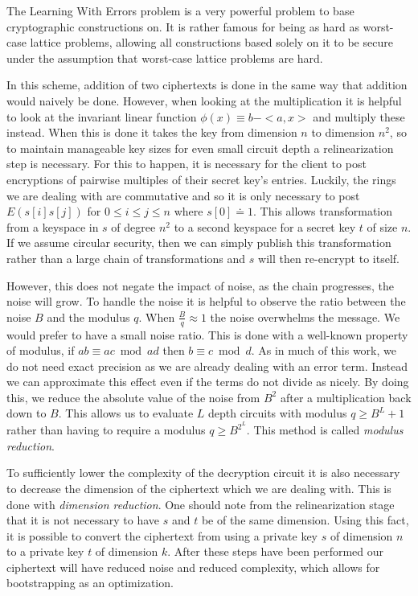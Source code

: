 \documentclass[letterpaper,twocolumn,10pt]{article}
\begin{document}
The Learning With Errors problem is a very powerful problem to base cryptographic constructions on. It is rather famous for being as hard as worst-case lattice problems, allowing all constructions based solely on it to be secure under the assumption that worst-case lattice problems are hard.

In this scheme, addition of two ciphertexts is done in the same way that addition would naively be done. However, when looking at the multiplication it is helpful to look at the invariant linear function $\phi(x) \equiv b - <a,x>$ and multiply these instead. When this is done it takes the key from dimension $n$ to dimension $n^2$, so to maintain manageable key sizes for even small circuit depth a relinearization step is necessary. For this to happen, it is necessary for the client to post encryptions of pairwise multiples of their secret key's entries. Luckily, the rings we are dealing with are commutative and so it is only necessary to post $E(s[i]s[j])$ for $0 \leq i \leq j \leq n$ where $s[0] \doteq 1$. This allows transformation from a keyspace in $s$ of degree $n^2$ to a second keyspace for a secret key $t$ of size $n$. If we assume circular security, then we can simply publish this transformation rather than a large chain of transformations and $s$ will then re-encrypt to itself.

However, this does not negate the impact of noise, as the chain progresses, the noise will grow. To handle the noise it is helpful to observe the ratio between the noise $B$ and the modulus $q$. When $\frac{B}{q} \approx 1$ the noise overwhelms the message. We would prefer to have a small noise ratio. This is done with a well-known property of modulus, if $ab \equiv ac \bmod ad$ then $b \equiv c \bmod d$. As in much of this work, we do not need exact precision as we are already dealing with an error term. Instead we can approximate this effect even if the terms do not divide as nicely. By doing this, we reduce the absolute value of the noise from $B^2$ after a multiplication back down to $B$. This allows us to evaluate $L$ depth circuits with modulus $q \geq B^L+1$ rather than having to require a modulus $q \geq B^{2^L}$. This method is called \emph{modulus reduction}.

To sufficiently lower the complexity of the decryption circuit it is also necessary to decrease the dimension of the ciphertext which we are dealing with. This is done with \emph{dimension reduction}. One should note from the relinearization stage that it is not necessary to have $s$ and $t$ be of the same dimension. Using this fact, it is possible to convert the ciphertext from using a private key $s$ of dimension $n$ to a private key $t$ of dimension $k$. After these steps have been performed our ciphertext will have reduced noise and reduced complexity, which allows for bootstrapping as an optimization.
\end{document}
